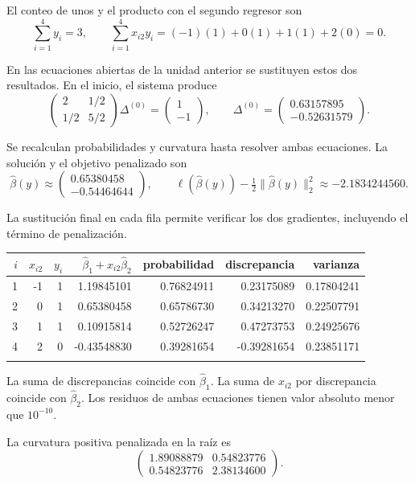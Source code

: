 \documentclass[11pt,a4paper]{article}
\begin{document}
El conteo de unos y el producto con el segundo regresor son
\[
\sum_{i=1}^4 y_i=3,\qquad\sum_{i=1}^4x_{i2}y_i=(-1)(1)+0(1)+1(1)+2(0)=0.
\]

En las ecuaciones abiertas de la unidad anterior se sustituyen
estos dos resultados. En el inicio, el sistema produce
\[
\begin{pmatrix}2&1/2\\1/2&5/2\end{pmatrix}\Delta^{(0)}=\begin{pmatrix}1\\-1\end{pmatrix},\qquad\Delta^{(0)}=\begin{pmatrix}0.63157895\\-0.52631579\end{pmatrix}.
\]

Se recalculan probabilidades y curvatura hasta resolver
ambas ecuaciones. La solución y el objetivo penalizado son
\[
\widehat\beta(y)\approx\begin{pmatrix}0.65380458\\-0.54464644\end{pmatrix},\qquad \ell(\widehat\beta(y))-\tfrac12\|\widehat\beta(y)\|_2^2\approx-2.1834244560.
\]

La sustitución final en cada fila permite verificar
los dos gradientes, incluyendo el término de penalización.
\begin{center}\scriptsize
\begin{tabular}{rrrrrrr}\toprule
\(i\)&\(x_{i2}\)&\(y_i\)&\(\widehat\beta_1+x_{i2}\widehat\beta_2\)&probabilidad&discrepancia&varianza\\\midrule
1&-1&1&1.19845101&0.76824911&0.23175089&0.17804241\\
2&0&1&0.65380458&0.65786730&0.34213270&0.22507791\\
3&1&1&0.10915814&0.52726247&0.47273753&0.24925676\\
4&2&0&-0.43548830&0.39281654&-0.39281654&0.23851171\\
\\\bottomrule\end{tabular}\end{center}
La suma de discrepancias coincide con \(\widehat\beta_1\).
La suma de \(x_{i2}\) por discrepancia coincide con
\(\widehat\beta_2\). Los residuos de ambas ecuaciones
tienen valor absoluto menor que \(10^{-10}\).

La curvatura positiva penalizada en la raíz es
\[
\begin{pmatrix}1.89088879&0.54823776\\0.54823776&2.38134600\end{pmatrix}.
\]
\end{document}
